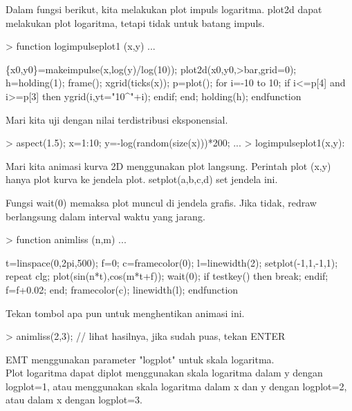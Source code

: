 \documentclass[a4paper,10pt]{article}
\begin{document}
\begin{eulernotebook}
\begin{eulercomment}
\begin{eulercomment}
\begin{eulercomment}
\begin{eulercomment}
\begin{eulercomment}
\begin{eulercomment}
\begin{eulercomment}
Dalam fungsi berikut, kita melakukan plot impuls logaritma. plot2d
dapat melakukan plot logaritma, tetapi tidak untuk batang impuls.
\end{eulercomment}
\begin{eulerprompt}
> function logimpulseplot1 (x,y) ...
\end{eulerprompt}
\begin{eulerudf}
    \{x0,y0\}=makeimpulse(x,log(y)/log(10));
    plot2d(x0,y0,>bar,grid=0);
    h=holding(1);
    frame();
    xgrid(ticks(x));
    p=plot();
    for i=-10 to 10;
      if i<=p[4] and i>=p[3] then
         ygrid(i,yt="10^"+i);
      endif;
    end;
    holding(h);
  endfunction
\end{eulerudf}
\begin{eulercomment}
Mari kita uji dengan nilai terdistribusi eksponensial.
\end{eulercomment}
\begin{eulerprompt}
> aspect(1.5); x=1:10; y=-log(random(size(x)))*200; ...
> logimpulseplot1(x,y):
\end{eulerprompt}
\begin{eulercomment}
Mari kita animasi kurva 2D menggunakan plot langsung. Perintah plot
(x,y) hanya plot kurva ke jendela plot. setplot(a,b,c,d) set jendela
ini.

Fungsi wait(0) memaksa plot muncul di jendela grafis. Jika tidak,
redraw berlangsung dalam interval waktu yang jarang.
\end{eulercomment}
\begin{eulerprompt}
> function animliss (n,m) ...
\end{eulerprompt}
\begin{eulerudf}
  t=linspace(0,2pi,500);
  f=0;
  c=framecolor(0);
  l=linewidth(2);
  setplot(-1,1,-1,1);
  repeat
    clg;
    plot(sin(n*t),cos(m*t+f));
    wait(0);
    if testkey() then break; endif;
    f=f+0.02;
  end;
  framecolor(c);
  linewidth(l);
  endfunction
\end{eulerudf}
\begin{eulercomment}
Tekan tombol apa pun untuk menghentikan animasi ini.
\end{eulercomment}
\begin{eulerprompt}
> animliss(2,3); // lihat hasilnya, jika sudah puas, tekan ENTER
\end{eulerprompt}
\begin{eulercomment}
EMT menggunakan parameter "logplot" untuk skala logaritma.\\
Plot logaritma dapat diplot menggunakan skala logaritma dalam y dengan
logplot=1, atau menggunakan skala logaritma dalam x dan y dengan
logplot=2, atau dalam x dengan logplot=3.


\end{eulercomment}
\end{eulercomment}
\end{eulercomment}
\end{eulercomment}
\end{eulercomment}
\end{eulercomment}
\end{eulercomment}
\end{eulernotebook}
\end{document}
